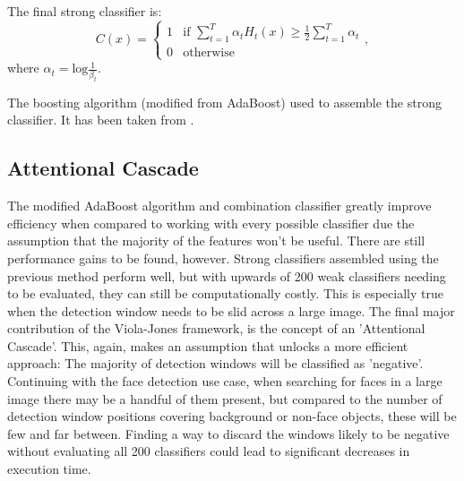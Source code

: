 \documentclass[11pt,a4paper,oldfontcommands]{memoir}
\begin{document}
\begin{algorithm}
\begin{algorithmic}
        The final strong classifier is:
        \begin{equation}
            C(x) = 
            \begin{cases} 
                1 & \textrm{if  } \sum\limits_{t=1}^T \alpha_t H_t(x) \geq \frac{1}{2} \sum\limits_{t=1}^T \alpha_t \\ 
                0 & \textrm{otherwise}
            \end{cases}
            ,
        \end{equation}
        where $\alpha_t = \textrm{log}\frac{1}{\beta_t}$.

        \caption{The boosting algorithm (modified from AdaBoost) used to assemble the strong classifier. It has been taken from \cite{viola_updated}.}
    \end{algorithmic}
\end{algorithm}

\subsection{Attentional Cascade}
The modified AdaBoost algorithm and combination classifier greatly improve efficiency when compared to working with every possible classifier due the assumption that the majority of the features won't be useful. There are still performance gains to be found, however. Strong classifiers assembled using the previous method perform well, but with upwards of 200 weak classifiers needing to be evaluated, they can still be computationally costly. This is especially true when the detection window needs to be slid across a large image. The final major contribution of the Viola-Jones framework, is the concept of an 'Attentional Cascade'. This, again, makes an assumption that unlocks a more efficient approach: The majority of detection windows will be classified as 'negative'. Continuing with the face detection use case, when searching for faces in a large image there may be a handful of them present, but compared to the number of detection window positions covering background or non-face objects, these will be few and far between. Finding a way to discard the windows likely to be negative without evaluating all 200 classifiers could lead to significant decreases in execution time.
\end{document}
